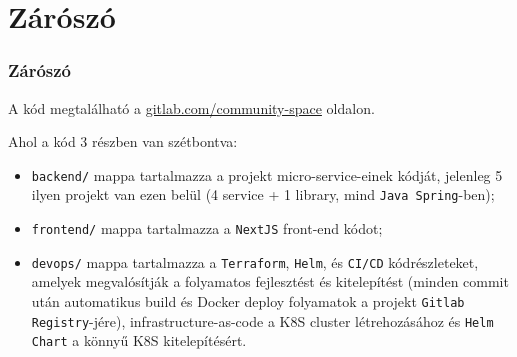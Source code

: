 \section{Zárószó}

\begin{frame}
    \frametitle{Zárószó}

    A kód megtalálható a \href{https://gitlab.com/rockdonald2/community-space}{gitlab.com/community-space} oldalon.

    \medbreak

    Ahol a kód 3 részben van szétbontva:
    \begin{itemize}
        \item \texttt{backend/} mappa tartalmazza a projekt micro-service-einek kódját, jelenleg 5 ilyen projekt van ezen belül (4 service + 1 library, mind \texttt{Java Spring}-ben);
        \item \texttt{frontend/} mappa tartalmazza a \texttt{NextJS} front-end kódot;
        \item \texttt{devops/} mappa tartalmazza a \texttt{Terraform}, \texttt{Helm}, és \texttt{CI/CD} kódrészleteket, amelyek megvalósítják a folyamatos fejlesztést és kitelepítést (minden commit után automatikus build és Docker deploy folyamatok a projekt \texttt{Gitlab Registry}-jére), infrastructure-as-code a K8S cluster létrehozásához és \texttt{Helm Chart} a könnyű K8S kitelepítésért.
    \end{itemize}

\end{frame}